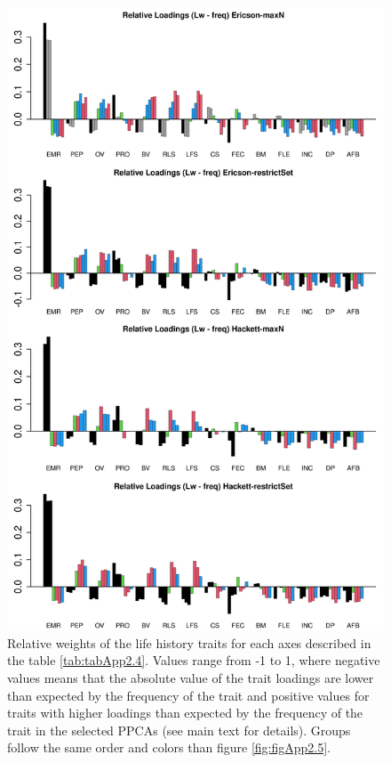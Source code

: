 \begin{figure}[ht!]
\centering
\includegraphics[width=.8\textwidth]{./Figures/Appendix2_1/2nd relWeights plots-ALL.png}
\caption[LHT relative importance of the secondary axes]{
Relative weights of the life history traits for each axes described in the
table \ref{tab:tabApp2.4}. Values range from -1 to 1, where negative values
means that the absolute value of the trait loadings are lower than expected by
the frequency of the trait and positive values for traits with higher loadings
than expected by the frequency of the trait in the selected PPCAs (see main
text for details). Groups follow the same order and colors than figure
\ref{fig:figApp2.5}.}
\label{fig:figApp2.4}
\end{figure}

